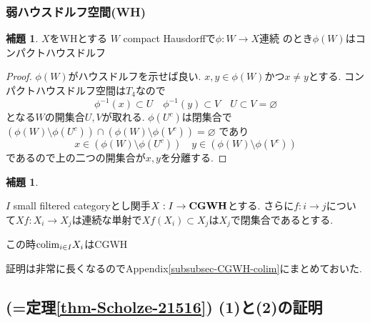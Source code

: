 \documentclass[dvipdfmx,a4paper,11pt]{report}
\newcommand{\colim}{{\rm colim}}
\theoremstyle{definition}
\newtheorem{lem}[thm]{補題}
\newcommand{\xr}[1]{\textcolor{red}{#1}}
\begin{document}
\subsubsection{弱ハウスドルフ空間(WH)}

\begin{tcolorbox}
 [colback = white, colframe = green!35!black, fonttitle = \bfseries,breakable = true]
\begin{lem}\cite[Lemma 1.3]{Str}
\label{lem-weakhaus}
$X$をWHとする 
$W$ compact Hausdorffで$\phi : W \to X$連続
のとき$\phi(W)$はコンパクトハウスドルフ
\end{lem}
\end{tcolorbox}

\begin{proof}
$\phi(W)$がハウスドルフを示せば良い.
$x,y \in \phi(W)$かつ$x \neq y$とする.
コンパクトハウスドルフ空間は$T_4$なので
$$
\phi^{-1}(x) \subset U\quad
\phi^{-1}(y) \subset V\quad
U \subset V = \varnothing
$$
となる$W$の開集合$U,V$が取れる. 
$\phi(U^{c})$は閉集合で
$\left( \phi(W) \setminus \phi(U^c) \right) \cap \left( \phi(W) \setminus \phi(V^c) \right) = \varnothing$
であり
$$
x \in \left( \phi(W) \setminus \phi(U^c) \right) \quad
y \in \left( \phi(W) \setminus \phi(V^c) \right) 
$$
であるので上の二つの開集合が$x,y$を分離する.
\end{proof}



\begin{tcolorbox}
 [colback = white, colframe = green!35!black, fonttitle = \bfseries,breakable = true]

\begin{lem}\cite[Lemma 3.3]{Str}
\label{lem-weakhaus-2}

$I$ small filtered categoryとし関手$X : I \to {\bf CGWH}$とする. 
さらに$f: i \to j$について$Xf : X_i \to X_j$は連続な単射で$Xf(X_i) \subset X_j$は$X_j$で閉集合であるとする. 

この時$\colim_{i \in I}X_i$はCGWH
\end{lem}
\end{tcolorbox}
証明は非常に長くなるのでAppendix\ref{subsubsec-CGWH-colim}にまとめておいた. 

\subsection{\cite[Proposition 2.15, Theorem 2.16]{Sch19}(=定理\ref{thm-Scholze-21516}) (1)と(2)の証明}
\end{document}
